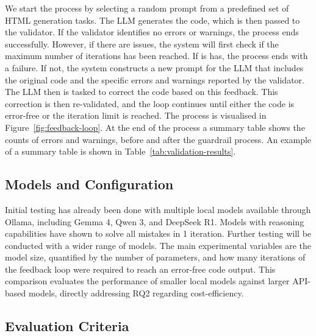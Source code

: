 We start the process by selecting a random prompt from a predefined set of HTML generation tasks. The LLM generates the code, which is then passed to the validator. If the validator identifies no errors or warnings, the process ends successfully. However, if there are issues, the system will first check if the maximum number of iterations has been reached. If is has, the process ends with a failure. If not, the system constructs a new prompt for the LLM that includes the original code and the specific errors and warnings reported by the validator. The LLM then is tasked to correct the code based on this feedback. This correction is then re-validated, and the loop continues until either the code is error-free or the iteration limit is reached. The process is visualised in Figure~\ref{fig:feedback-loop}. At the end of the process a summary table shows the counts of errors and warnings, before and after the guardrail process. An example of a summary table is shown in Table~\ref{tab:validation-results}.


\subsection{Models and Configuration}



Initial testing has already been done with multiple local models available through Ollama, including Gemma 4, Qwen 3, and DeepSeek R1. Models with reasoning capabilities have shown to solve all mistakes in 1 iteration. Further testing will be conducted with a wider range of models. The main experimental variables are the model size, quantified by the number of parameters, and how many iterations of the feedback loop were required to reach an error-free code output. This comparison evaluates the performance of smaller local models against larger API-based models, directly addressing RQ2 regarding cost-efficiency.

\subsection{Evaluation Criteria}


